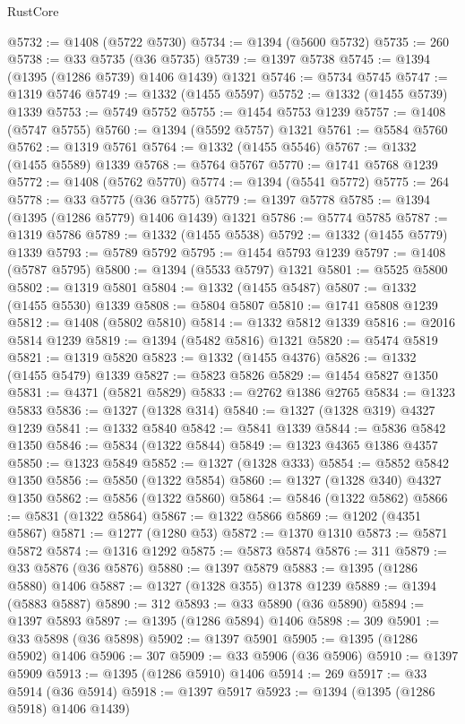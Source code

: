 \begin{lexlean}{RustCore}
\begin{coremodule}
@5732 := @1408 (@5722 @5730)
@5734 := @1394 (@5600 @5732)
@5735 := 260
@5738 := @33 @5735 (@36 @5735)
@5739 := @1397 @5738
@5745 := @1394 (@1395 (@1286 @5739) @1406 @1439) @1321
@5746 := @5734 @5745
@5747 := @1319 @5746
@5749 := @1332 (@1455 @5597)
@5752 := @1332 (@1455 @5739) @1339
@5753 := @5749 @5752
@5755 := @1454 @5753 @1239
@5757 := @1408 (@5747 @5755)
@5760 := @1394 (@5592 @5757) @1321
@5761 := @5584 @5760
@5762 := @1319 @5761
@5764 := @1332 (@1455 @5546)
@5767 := @1332 (@1455 @5589) @1339
@5768 := @5764 @5767
@5770 := @1741 @5768 @1239
@5772 := @1408 (@5762 @5770)
@5774 := @1394 (@5541 @5772)
@5775 := 264
@5778 := @33 @5775 (@36 @5775)
@5779 := @1397 @5778
@5785 := @1394 (@1395 (@1286 @5779) @1406 @1439) @1321
@5786 := @5774 @5785
@5787 := @1319 @5786
@5789 := @1332 (@1455 @5538)
@5792 := @1332 (@1455 @5779) @1339
@5793 := @5789 @5792
@5795 := @1454 @5793 @1239
@5797 := @1408 (@5787 @5795)
@5800 := @1394 (@5533 @5797) @1321
@5801 := @5525 @5800
@5802 := @1319 @5801
@5804 := @1332 (@1455 @5487)
@5807 := @1332 (@1455 @5530) @1339
@5808 := @5804 @5807
@5810 := @1741 @5808 @1239
@5812 := @1408 (@5802 @5810)
@5814 := @1332 @5812 @1339
@5816 := @2016 @5814 @1239
@5819 := @1394 (@5482 @5816) @1321
@5820 := @5474 @5819
@5821 := @1319 @5820
@5823 := @1332 (@1455 @4376)
@5826 := @1332 (@1455 @5479) @1339
@5827 := @5823 @5826
@5829 := @1454 @5827 @1350
@5831 := @4371 (@5821 @5829)
@5833 := @2762 @1386 @2765
@5834 := @1323 @5833
@5836 := @1327 (@1328 @314)
@5840 := @1327 (@1328 @319) @4327 @1239
@5841 := @1332 @5840
@5842 := @5841 @1339
@5844 := @5836 @5842 @1350
@5846 := @5834 (@1322 @5844)
@5849 := @1323 @4365 @1386 @4357
@5850 := @1323 @5849
@5852 := @1327 (@1328 @333)
@5854 := @5852 @5842 @1350
@5856 := @5850 (@1322 @5854)
@5860 := @1327 (@1328 @340) @4327 @1350
@5862 := @5856 (@1322 @5860)
@5864 := @5846 (@1322 @5862)
@5866 := @5831 (@1322 @5864)
@5867 := @1322 @5866
@5869 := @1202 (@4351 @5867)
@5871 := @1277 (@1280 @53)
@5872 := @1370 @1310
@5873 := @5871 @5872
@5874 := @1316 @1292
@5875 := @5873 @5874
@5876 := 311
@5879 := @33 @5876 (@36 @5876)
@5880 := @1397 @5879
@5883 := @1395 (@1286 @5880) @1406
@5887 := @1327 (@1328 @355) @1378 @1239
@5889 := @1394 (@5883 @5887)
@5890 := 312
@5893 := @33 @5890 (@36 @5890)
@5894 := @1397 @5893
@5897 := @1395 (@1286 @5894) @1406
@5898 := 309
@5901 := @33 @5898 (@36 @5898)
@5902 := @1397 @5901
@5905 := @1395 (@1286 @5902) @1406
@5906 := 307
@5909 := @33 @5906 (@36 @5906)
@5910 := @1397 @5909
@5913 := @1395 (@1286 @5910) @1406
@5914 := 269
@5917 := @33 @5914 (@36 @5914)
@5918 := @1397 @5917
@5923 := @1394 (@1395 (@1286 @5918) @1406 @1439)

\end{coremodule}
\end{lexlean}

